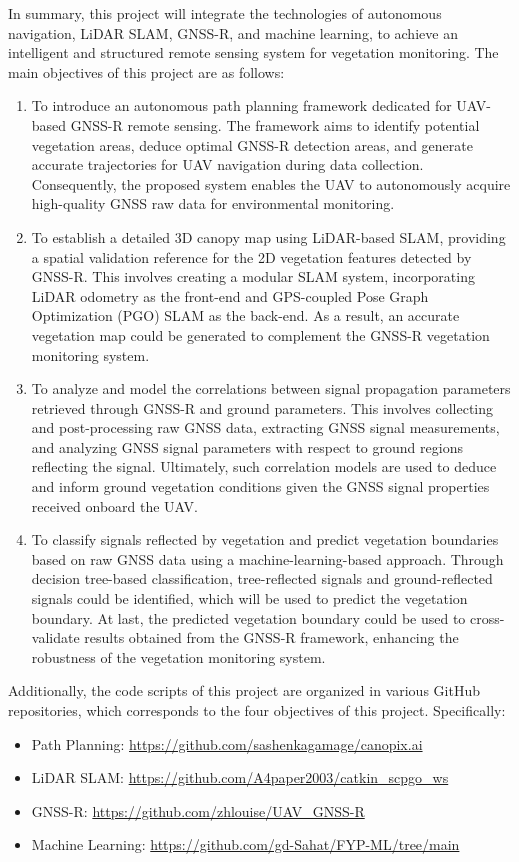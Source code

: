\documentclass[12pt, a4paper]{article}
\begin{document}
In summary, this project will integrate the technologies of autonomous
navigation, LiDAR SLAM, GNSS-R, and machine learning, to achieve an intelligent
and structured remote sensing system for vegetation monitoring. The main
objectives of this project are as follows:
\begin{enumerate}
\item To introduce an autonomous path planning framework dedicated for UAV-based
GNSS-R remote sensing. The framework aims to identify potential vegetation
areas, deduce optimal GNSS-R detection areas, and generate accurate trajectories
for UAV navigation during data collection. Consequently, the proposed system
enables the UAV to autonomously acquire high-quality GNSS raw data for
environmental monitoring.
\item To establish a detailed 3D canopy map using LiDAR-based SLAM, providing a
spatial validation reference for the 2D vegetation features detected by GNSS-R.
This involves creating a modular SLAM system, incorporating LiDAR odometry as
the front-end and GPS-coupled Pose Graph Optimization (PGO) SLAM as the
back-end. As a result, an accurate vegetation map could be generated to
complement the GNSS-R vegetation monitoring system.
\item To analyze and model the correlations between signal propagation
parameters retrieved through GNSS-R and ground parameters. This involves
collecting and post-processing raw GNSS data, extracting GNSS signal
measurements, and analyzing GNSS signal parameters with respect to ground
regions reflecting the signal. Ultimately, such correlation models are used to
deduce and inform ground vegetation conditions given the GNSS signal properties
received onboard the UAV.
\item To classify signals reflected by vegetation and predict vegetation
boundaries based on raw GNSS data using a machine-learning-based approach.
Through decision tree-based classification, tree-reflected signals and
ground-reflected signals could be identified, which will be used to predict the
vegetation boundary. At last, the predicted vegetation boundary could be used to
cross-validate results obtained from the GNSS-R framework, enhancing the
robustness of the vegetation monitoring system.
\end{enumerate}

Additionally, the code scripts of this project are organized in various GitHub
repositories, which corresponds to the four objectives of this project.
Specifically: 
\begin{itemize}
    \item Path Planning: \url{https://github.com/sashenkagamage/canopix.ai} 
    \item LiDAR SLAM: \url{https://github.com/A4paper2003/catkin_scpgo_ws}
    \item GNSS-R: \url{https://github.com/zhlouise/UAV_GNSS-R}
    \item Machine Learning: \url{https://github.com/gd-Sahat/FYP-ML/tree/main}
\end{itemize}
\end{document}
